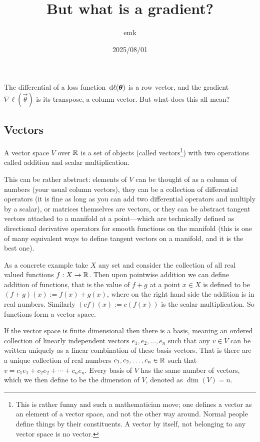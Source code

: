 \documentclass[12pt]{amsart}
\title{But what is a gradient?}
\author{emk}
\date{2025/08/01}
\begin{document}
\maketitle

The differential of a loss function $\,\mathrm{d} \ell(\mathbf{\boldsymbol{\theta}})$ is a row vector, and the gradient $\nabla\ell(\vec{\theta})$ is its transpose, a column vector. But what does this all mean?


\subsection*{Vectors}
A vector space $V$ over $\mathbb{R}$ is a set of objects (called vectors\footnote{This is rather funny and such a mathematician move; one defines a vector as an element of a vector space, and not the other way around. Normal people define things by their constituents. A vector by itself, not belonging to any vector space is no vector.}) with two operations called addition and scalar multiplication.

This can be rather abstract: elements of $V$ can be thought of as a column of numbers (your usual column vectors), they can be a collection of differential operators (it is fine as long as you can add two differential operators and multiply by a scalar), or matrices themselves are vectors, or they can be abstract tangent vectors attached to a manifold at a point---which are technically defined as directional derivative operators for smooth functions on the manifold (this is one of many equivalent ways to define tangent vectors on a manifold, and it is the best one). 

As a concrete example take $X$ any set and consider the collection of all real valued functions $f: X \to \mathbb{R}$. Then upon pointwise addition we can define addition of functions, that is the value of $f + g$ at a point $x\in X$ is defined to be $(f + g)(x) := f(x) + g(x)$, where on the right hand side the addition is in real numbers. Similarly $(cf)(x) := c(f(x))$ is the scalar multiplication. So functions form a vector space.

If the vector space is finite dimensional then there is a basis, meaning an ordered collection of linearly independent vectors $e_1, e_2, \ldots, e_n$ such that any $v \in V$ can be written uniquely as a linear combination of these basis vectors. That is there are a unique collection of real numbers $c_1, c_2, \ldots, c_n \in \mathbb{R}$ such that $v = c_1 e_1 + c_2 e_2 + \cdots + c_n e_n$. Every basis of $V$ has the same number of vectors, which we then define to be the dimension of $V$, denoted as $\dim(V) = n$. 
\end{document}

